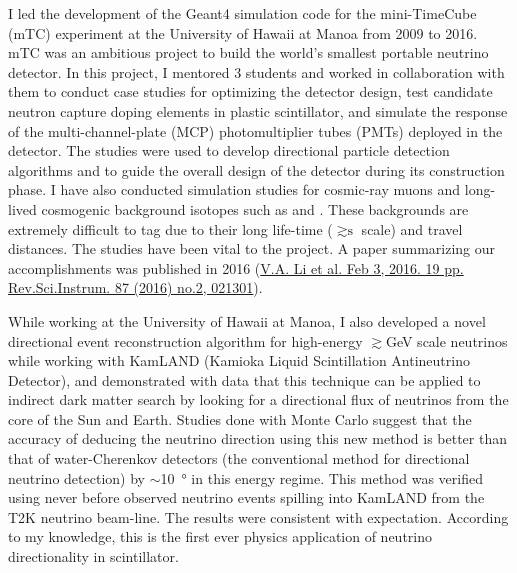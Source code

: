 \documentclass[11pt]{article} %
\begin{document}
I led the development of the Geant4 simulation code for the
mini-TimeCube (mTC) experiment at the University of Hawaii at Manoa from 2009
to 2016. mTC was an ambitious project to build the world's smallest portable
neutrino detector. In this project, I mentored 3 students and worked in
collaboration with them to conduct case studies for optimizing the detector
design, test candidate neutron capture doping elements in plastic scintillator,
and simulate the response of the multi-channel-plate (MCP) photomultiplier
tubes (PMTs) deployed in the detector. The studies were used to develop
directional particle detection algorithms and to guide the overall design of the
detector during its construction phase. I have also conducted simulation
studies for cosmic-ray muons and long-lived cosmogenic background isotopes such
as  and . These backgrounds are extremely difficult to
tag due to their long life-time ($\gtrsim \si{\second}$ scale) and travel
distances. The studies have been vital to the project. A paper summarizing our
accomplishments was published in 2016
(\href{https://arxiv.org/abs/1602.01405}{V.A. Li et al. Feb 3, 2016. 19 pp.
Rev.Sci.Instrum. 87 (2016) no.2, 021301}).

While working at the University of Hawaii at Manoa, I also developed a novel
directional event reconstruction algorithm for high-energy
$\gtrsim$\si{\giga\electronvolt} scale neutrinos while working with KamLAND
(Kamioka Liquid Scintillation Antineutrino Detector), and demonstrated with
data that this technique can be applied to indirect dark matter search by
looking for a directional flux of neutrinos from the core of the Sun and Earth.
Studies done with Monte Carlo suggest that the accuracy of deducing the
neutrino direction using this new method is better than that of water-Cherenkov
detectors (the conventional method for directional neutrino detection) by
$\sim$\SI{10}{\degree} in this energy regime. This method was verified using
never before observed neutrino events spilling into KamLAND from the T2K
neutrino beam-line. The results were consistent with expectation. According to
my knowledge, this is the first ever physics application of neutrino
directionality in scintillator.

\end{document}
